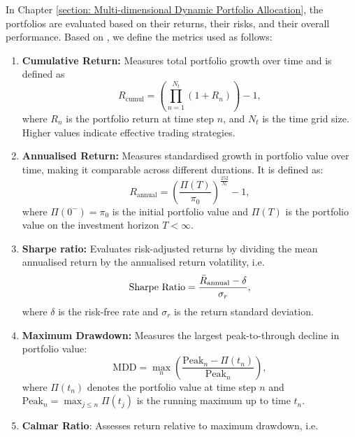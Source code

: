 \label{appendix: portfolio performance metrics}
In Chapter \ref{section: Multi-dimensional Dynamic Portfolio Allocation}, the portfolios are evaluated based on their returns, their risks, and their overall performance. Based on \cite{wang2025risk, mcneil2015quantitative}, we define the metrics used as follows:
\begin{enumerate}
    \item \textbf{Cumulative Return:} Measures total portfolio growth over time and is defined as
    \begin{equation*}
        R_\text{cumul} = \left(\prod_{n=1}^{N_t}(1+R_n) \right) - 1,
    \end{equation*}
    where $R_n$ is the portfolio return at time step $n$, and $N_t$ is the time grid size. Higher values indicate effective trading strategies.
    \item \textbf{Annualised Return:} Measures standardised growth in portfolio value over time, making it comparable across different durations. It is defined as:
    \begin{equation*}
        R_\text{annual} = \left(\frac{\Pi(T)}{\pi_0} \right)^{\frac{252}{N_t}} - 1,
    \end{equation*}
    where $\Pi(0^-)=\pi_0$ is the initial portfolio value and $\Pi(T)$ is the portfolio value on the investment horizon $T<\infty$. 
    \item \textbf{Sharpe ratio:} Evaluates risk-adjusted returns by dividing the mean annualised return by the annualised return volatility, i.e.
    \begin{equation*}
        \text{Sharpe Ratio} = \frac{\Bar{R}_\text{annual} - \delta}{\sigma_r},
    \end{equation*}
    where $\delta$ is the risk-free rate and $\sigma_r$ is the return standard deviation. 
    \item \textbf{Maximum Drawdown:} Measures the largest peak-to-through decline in portfolio value:
    \begin{equation*}
        \text{MDD} = \max_n \left(\frac{\text{Peak}_n - \Pi(t_n)}{\text{Peak}_n} \right),
    \end{equation*}
    where $\Pi(t_n)$ denotes the portfolio value at time step $n$ and $\text{Peak}_n = \max_{j \leq n} \Pi(t_j)$ is the running maximum up to time $t_n$. 
    \item \textbf{Calmar Ratio}: Assesses return relative to maximum drawdown, i.e.

\end{enumerate}
